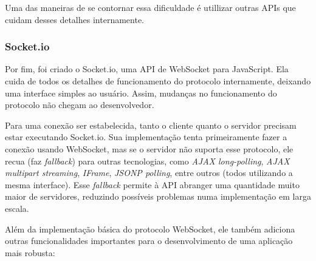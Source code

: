 \documentclass[a4paper,12pt]{article}
\begin{document}
Uma das maneiras de se contornar essa dificuldade é utillizar outras APIs que cuidam desses detalhes internamente.


\subsubsection{Socket.io}

Por fim, foi criado o Socket.io, uma API de WebSocket para JavaScript. Ela cuida de todos os detalhes de funcionamento do protocolo internamente, deixando uma interface simples ao usuário. Assim, mudanças no funcionamento do protocolo não chegam ao desenvolvedor.

Para uma conexão ser estabelecida, tanto o cliente quanto o servidor precisam estar executando Socket.io. Sua implementação tenta primeiramente fazer a conexão usando WebSocket, mas se o servidor não suporta esse protocolo, ele recua (faz \emph{fallback}) para outras tecnologias, como \emph{AJAX long-polling}, \emph{AJAX multipart streaming}, \emph{IFrame}, \emph{JSONP polling}, entre outros (todos utilizando a mesma interface). Esse \emph{fallback} permite à API abranger uma quantidade muito maior de servidores, reduzindo possíveis problemas numa implementação em larga escala.

Além da implementação básica do protocolo WebSocket, ele também adiciona outras funcionalidades importantes para o desenvolvimento de uma aplicação mais robusta:
\end{document}
